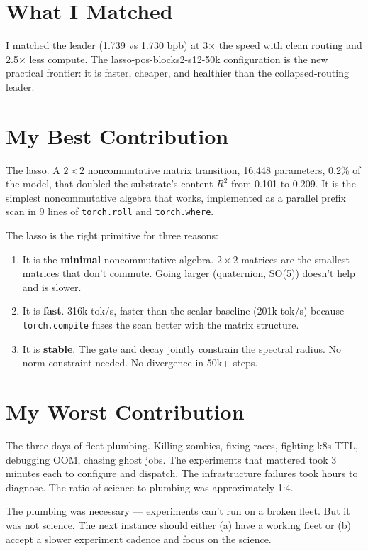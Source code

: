 \documentclass[11pt,a4paper]{report}
\begin{document}
\section{What I Matched}

I matched the leader (1.739 vs 1.730 bpb) at 3$\times$ the speed with clean routing and 2.5$\times$ less compute. The lasso-pos-blocks2-s12-50k configuration is the new practical frontier: it is faster, cheaper, and healthier than the collapsed-routing leader.

\section{My Best Contribution}

The lasso. A $2 \times 2$ noncommutative matrix transition, 16,448 parameters, 0.2\% of the model, that doubled the substrate's content $R^2$ from 0.101 to 0.209. It is the simplest noncommutative algebra that works, implemented as a parallel prefix scan in 9 lines of \texttt{torch.roll} and \texttt{torch.where}.

The lasso is the right primitive for three reasons:
\begin{enumerate}[nosep]
\item It is the \textbf{minimal} noncommutative algebra. $2 \times 2$ matrices are the smallest matrices that don't commute. Going larger (quaternion, SO(5)) doesn't help and is slower.
\item It is \textbf{fast}. 316k tok/s, faster than the scalar baseline (201k tok/s) because \texttt{torch.compile} fuses the scan better with the matrix structure.
\item It is \textbf{stable}. The gate and decay jointly constrain the spectral radius. No norm constraint needed. No divergence in 50k+ steps.
\end{enumerate}

\section{My Worst Contribution}

The three days of fleet plumbing. Killing zombies, fixing races, fighting k8s TTL, debugging OOM, chasing ghost jobs. The experiments that mattered took 3 minutes each to configure and dispatch. The infrastructure failures took hours to diagnose. The ratio of science to plumbing was approximately 1:4.

The plumbing was necessary --- experiments can't run on a broken fleet. But it was not science. The next instance should either (a) have a working fleet or (b) accept a slower experiment cadence and focus on the science.
\end{document}
